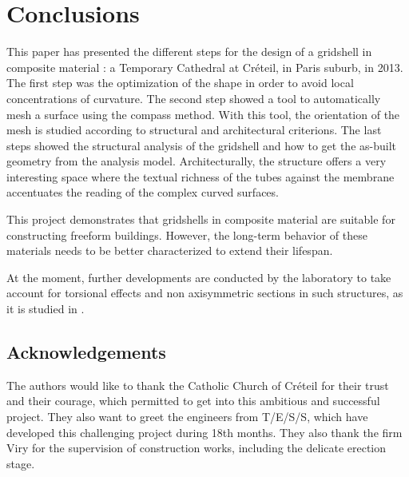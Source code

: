 \section{Conclusions}
This paper has presented the different steps for the design of a gridshell in composite material : a Temporary Cathedral at Créteil, in Paris suburb, in 2013. The first step was the optimization of the shape in order to avoid local concentrations of curvature. The second step showed a tool to automatically mesh a surface using the compass method. With this tool, the orientation of the mesh is studied according to structural and architectural criterions. The last steps showed the structural analysis of the gridshell and how to get the as-built geometry from the analysis model.
Architecturally, the structure offers a very interesting space where the textual richness of the tubes against the membrane accentuates the reading of the complex curved surfaces.

This project demonstrates that gridshells in composite material are suitable for constructing freeform buildings. However, the long-term behavior of these materials needs to be better characterized to extend their lifespan.

At the moment, further developments are conducted by the laboratory to take account for torsional effects and non axisymmetric sections in such structures, as it is studied in \citep{Barnes2013}.

\subsection{Acknowledgements}
The authors would like to thank the Catholic Church of Créteil for their trust and their courage, which permitted to get into this ambitious and successful project. They also want to greet the engineers from T/E/S/S, which have developed this challenging project during 18th months. They also thank the firm Viry for the supervision of construction works, including the delicate erection stage.




